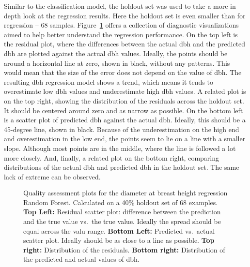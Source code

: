 Similar to the classification model, the holdout set was used to take a more in-depth look at the regression results.
Here the holdout set is even smaller than for regression – 68 samples.
Figure~\ref{fig-reg-residuals} offers a collection of diagnostic visualizations aimed to help better understand the regression performance.
On the top left is the residual plot, where the differences between the actual dbh and the predicted dbh are plotted against the actual dbh values.
Ideally, the points should be around a horizontal line at zero, shown in black, without any patterns.
This would mean that the size of the error does not depend on the value of dbh.
The resulting dbh regression model shows a trend, which means it tends to overestimate low dbh values and underestimate high dbh values.
A related plot is on the top right, showing the distribution of the residuals across the holdout set.
It should be centered around zero and as narrow as possible.
On the bottom left is a scatter plot of predicted dbh against the actual dbh.
Ideally, this should be a 45-degree line, shown in black.
Because of the underestimation on the high end and overestimation in the low end, the points seem to lie on a line with a smaller slope.
Although most points are in the middle, where the line is followed a lot more closely.
And, finally, a related plot on the bottom right, comparing distributions of the actual dbh and predicted dbh in the holdout set.
The same lack of extreme can be observed.

\begin{figure}
\caption[Quality assessment plots for the dbh regression Random Forest.]{\label{fig-reg-residuals}Quality assessment plots for the
diameter at breast height regression Random Forest. Calculated on a 40\%
holdout set of 68 examples. \textbf{Top Left:} Residual scatter plot:
difference between the prediction and the true value vs.~the true value.
Ideally the spread should be equal across the valu range. \textbf{Bottom
Left:} Predicted vs.~actual scatter plot. Ideally should be as close to
a line as possible. \textbf{Top right:} Distribution of the residuals.
\textbf{Bottom right:} Distribution of the predicted and actual values
of dbh.}
\end{figure}

